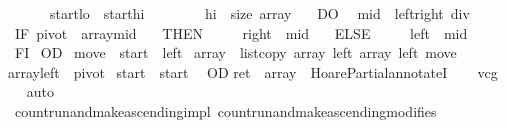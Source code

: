 \begin{isabellebody}
\ \ \ \ \ \ \ {\isasymacute}start{\isasymge}{\isasymacute}lo\ {\isasymand}\ {\isasymacute}start{\isacharless}{\isasymacute}hi\ {\isasymand}\isanewline
\ \ \ \ \ \ \ {\isasymacute}hi\ {\isasymle}\ size\ {\isasymacute}array\ \ {\isasymrbrace}\isanewline
\ DO\isanewline
\ \ {\isasymacute}mid\ {\isacharcolon}{\isacharequal}{\isacharequal}\ {\isacharparenleft}{\isasymacute}left{\isacharplus}{\isasymacute}right{\isacharparenright}\ div\ {}{\isacharsemicolon}{\isacharsemicolon}\isanewline
\ \ IF\ {\isasymacute}pivot\ {\isacharless}\ {\isasymacute}array{\isacharbang}{\isasymacute}mid\ \isanewline
\ \ THEN\ \isanewline
\ \ \ \ {\isasymacute}right\ {\isacharcolon}{\isacharequal}{\isacharequal}\ {\isasymacute}mid\ \isanewline
\ \ ELSE\ \isanewline
\ \ \ \ {\isasymacute}left\ {\isacharcolon}{\isacharequal}{\isacharequal}\ {\isasymacute}mid{\isacharplus}{}\ \isanewline
\ \ FI\isanewline
\ OD{\isacharsemicolon}{\isacharsemicolon}\isanewline
\ {\isasymacute}move\ {\isacharcolon}{\isacharequal}{\isacharequal}\ {\isasymacute}start\ {\isacharminus}\ {\isasymacute}left{\isacharsemicolon}{\isacharsemicolon}\isanewline
\ {\isasymacute}array\ {\isacharcolon}{\isacharequal}{\isacharequal}\ list{\isacharunderscore}copy\ {\isasymacute}array\ {\isacharparenleft}{\isasymacute}left{\isacharplus}{}{\isacharparenright}\ {\isasymacute}array\ {\isasymacute}left\ {\isasymacute}move{\isacharsemicolon}{\isacharsemicolon}\isanewline
\ {\isasymacute}array{\isacharbang}{\isasymacute}left\ {\isacharcolon}{\isacharequal}{\isacharequal}\ {\isasymacute}pivot{\isacharsemicolon}{\isacharsemicolon}\isanewline
\ {\isasymacute}start\ {\isacharcolon}{\isacharequal}{\isacharequal}\ {\isasymacute}start\ {\isacharplus}\ {}\isanewline
OD{\isacharsemicolon}{\isacharsemicolon}\isanewline
{\isasymacute}ret\ {\isacharcolon}{\isacharequal}{\isacharequal}\ {\isasymacute}array{\isachardoublequoteclose}\ \ HoarePartial{\isachardot}annotateI{\isacharparenright}\isanewline
\ \ \isamarkupfalse%
\ vcg\isanewline
\ \ \isamarkupfalse%
\ auto\isanewline
\ \ \isamarkupfalse%
%
\endisatagproof
{\isafoldproof}%
%
\isadelimproof
\isanewline
%
\endisadelimproof
\isanewline
{}\isamarkupfalse%
\ {\isacharparenleft}\ count{\isacharunderscore}run{\isacharunderscore}and{\isacharunderscore}make{\isacharunderscore}ascending{\isacharunderscore}impl{\isacharparenright}\ count{\isacharunderscore}run{\isacharunderscore}and{\isacharunderscore}make{\isacharunderscore}ascending{\isacharunderscore}modifies{\isacharcolon}\isanewline

\end{isabellebody}

